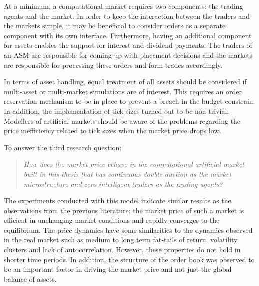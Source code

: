 At a minimum, a computational market requires two components: the trading agents and the 
market. In order to keep the interaction between the traders and the markets simple, it may be beneficial to 
consider orders as a separate component with its own interface. Furthermore, having an additional component for 
assets enables the support for interest and dividend payments. The traders of an ASM are responsible for coming up with 
placement decisions and the markets are responsible for processing these orders and form trades accordingly. 

In terms of asset handling, equal treatment of 
all assets should be considered if multi-asset or multi-market simulations are of interest. 
This requires an order reservation mechanism to be in place to prevent a breach in the 
budget constrain. In addition, the implementation of tick sizes turned out to be non-trivial. 
Modellers of artificial markets should be aware of the problems regarding the price inefficiency 
related to tick sizes when the market price drops low. 


To answer the third research question:
\begin{quote}
    \textit{How does the market price behave in the computational artificial market built in this thesis that has continuous
    double auction as the market microstructure and zero-intelligent traders as the 
    trading agents?} 
\end{quote}
The experiments conducted with this model indicate similar results as the observations from 
the previous literature: the market price of such a market is efficient in unchanging market conditions
and rapidly converges to the equilibrium. The price dynamics have some similarities to the dynamics 
observed in the real market such as medium to long term fat-tails of return, volatility clusters and 
lack of autocorrelation. However, these properties do not hold in shorter time periods. In addition, 
the structure of the order book was observed to be an important factor in driving the market price and 
not just the global balance of assets. 



